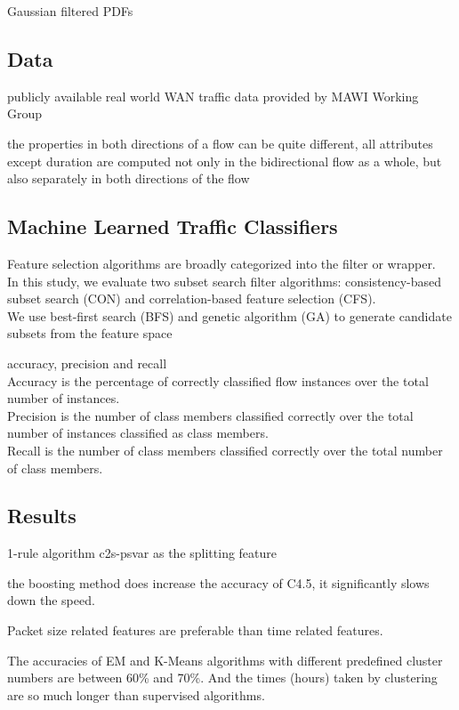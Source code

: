 \documentclass{article}
\begin{document}
Gaussian filtered PDFs

\subsection{Data}\label{data}
publicly available real world WAN traffic data provided by MAWI Working Group

the properties in both directions of a flow can be quite different, all attributes except duration are computed not only in the bidirectional flow as a whole, 
but also separately in both directions of the flow

\subsection{Machine Learned Traffic Classifiers}\label{machine-learned-traffic-classifiers}

Feature selection algorithms are broadly categorized into the filter or wrapper.\\
In this study, we evaluate two subset search filter algorithms: consistency-based subset search (CON) and correlation-based feature selection (CFS).\\
We use best-first search (BFS) and genetic algorithm (GA) to generate candidate subsets from the feature space

accuracy, precision and recall\\
Accuracy is the percentage of correctly classified flow instances over the total number of instances.\\
Precision is the number of class members classified correctly over the total number of instances classified as class members.\\
Recall is the number of class members classified correctly over the total number of class members.

\subsection{Results}\label{results}

1-rule algorithm c2s-psvar as the splitting feature

the boosting method does increase the accuracy of C4.5, it significantly slows down the speed.

Packet size related features are preferable than time related features.

The accuracies of EM and K-Means algorithms with different predefined cluster numbers are between 60\% and 70\%. 
And the times (hours) taken by clustering are so much longer than supervised algorithms.
\end{document}
